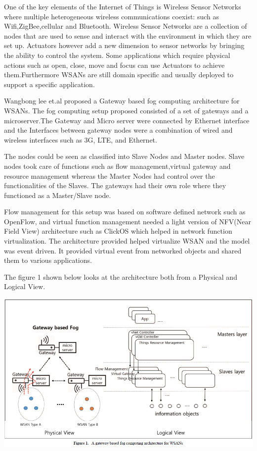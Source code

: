 \documentclass{article}
\begin{document}
One of the key elements of the Internet of Things is Wireless Sensor Networks where multiple heterogeneous wireless communications coexist: such as Wifi,ZigBee,cellular and Bluetooth. 
Wireless Sensor Networks are a collection of nodes that are used to sense and interact with the environment in which they are set up. Actuators however add a new dimension to sensor networks by bringing the ability to control the system. Some applications which require physical actions such as open, close, move and focus can use Actuators to achieve them.Furthermore WSANs are still domain specific and usually deployed to support a specific application\cite{lee2016gateway}.   

Wangbong lee et.al\cite{lee2016gateway} proposed a Gateway based fog computing architecture for WSANs. The fog computing setup proposed consisted of a set of gateways and a microserver\cite{lee2016gateway}.The Gateway and Micro server were connected by Ethernet interface and the Interfaces between gateway nodes were a combination of wired and wireless interfaces such as 3G, LTE, and Ethernet\cite{lee2016gateway}.

The nodes could be seen as classified into Slave Nodes and Master nodes. Slave nodes took care of functions such as flow management,virtual gateway and resource management whereas the Master Nodes had control over the functionalities of the Slaves\cite{lee2016gateway}. The gateways had their own role where they functioned as a Master/Slave node. 

Flow management for this setup was based on software defined network such as OpenFlow, and virtual function management needed a light version of NFV(Near Field View) architecture such as ClickOS\cite{martins2014clickos} which helped in network function virtualization.
The architecture provided helped virtualize WSAN and the model was event driven. It provided virtual event from networked objects and shared them to various applications.

The figure 1 shown below\cite{lee2016gateway} looks at the architecture both from a Physical and Logical View.

\includegraphics[scale=0.6]{gateway.png}
\end{document}
